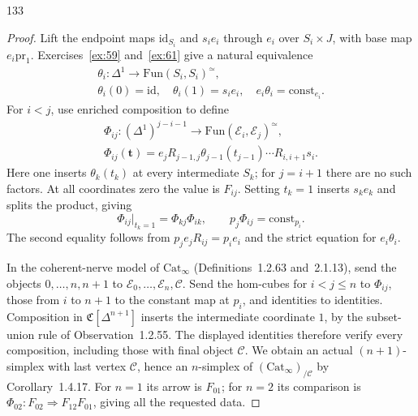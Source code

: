 \begin{exercise}{133}
\begin{proof}
Lift the endpoint maps $\mathrm{id}_{S_i}$ and $s_ie_i$ through $e_i$
over $S_i\times J$, with base map $e_i\mathrm{pr}_1$.
Exercises~\ref{ex:59} and~\ref{ex:61} give a natural equivalence
\[
 \begin{gathered}
 \theta_i\colon\Delta^1\to\mathrm{Fun}(S_i,S_i)^{\simeq},\\
 \theta_i(0)=\mathrm{id},\quad\theta_i(1)=s_ie_i,\quad
 e_i\theta_i=\mathrm{const}_{e_i}.
 \end{gathered}
\]
For $i<j$, use enriched composition to define
\[
 \begin{gathered}
 \Phi_{ij}\colon(\Delta^1)^{j-i-1}\to
       \mathrm{Fun}(\mathcal E_i,\mathcal E_j)^{\simeq},\\
 \Phi_{ij}(\mathbf t)=
 e_jR_{j-1,j}\theta_{j-1}(t_{j-1})\cdots R_{i,i+1}s_i.
 \end{gathered}
\]
Here one inserts $\theta_k(t_k)$ at every intermediate $S_k$;
for $j=i+1$ there are no such factors.
At all coordinates zero the value is $F_{ij}$.
Setting $t_k=1$ inserts $s_ke_k$ and splits the product, giving
\[
 \Phi_{ij}|_{t_k=1}=\Phi_{kj}\Phi_{ik},\qquad
 p_j\Phi_{ij}=\mathrm{const}_{p_i}.
\]
The second equality follows from $p_je_jR_{ij}=p_ie_i$ and the strict
equation for $e_i\theta_i$.

In the coherent-nerve model of $\mathrm{Cat}_\infty$
(Definitions~1.2.63 and~2.1.13), send the objects $0,\ldots,n,n+1$
to $\mathcal E_0,\ldots,\mathcal E_n,\mathcal C$.
Send the hom-cubes for $i<j\le n$ to $\Phi_{ij}$, those from $i$ to $n+1$
to the constant map at $p_i$, and identities to identities.
Composition in $\mathfrak C[\Delta^{n+1}]$ inserts the intermediate
coordinate $1$, by the subset-union rule of Observation~1.2.55.
The displayed identities therefore verify every composition, including
those with final object $\mathcal C$.
We obtain an actual $(n+1)$-simplex with last vertex $\mathcal C$,
hence an $n$-simplex of $(\mathrm{Cat}_\infty)_{/\mathcal C}$ by
Corollary~1.4.17.
For $n=1$ its arrow is $F_{01}$; for $n=2$ its comparison is
$\Phi_{02}\colon F_{02}\Rightarrow F_{12}F_{01}$, giving all the requested data.
\end{proof}
\end{exercise}
